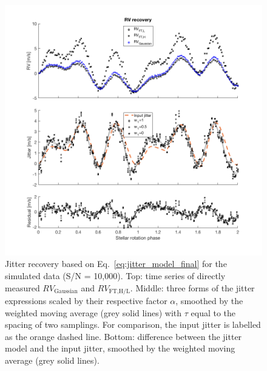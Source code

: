 \begin{figure}[tbp]
\centering
\includegraphics[width = 0.99 \linewidth]
{./Figures/Methods/5-PLANET_AND_JITTER2.png}
\caption[Jitter model]
{Jitter recovery based on Eq.~\ref{eq:jitter_model_final} for the simulated data (S/N = 10,000). Top: time series of directly measured $RV_\text{Gaussian}$ and $RV_\text{FT,H/L}$. Middle: three forms of the jitter expressions scaled by their respective factor $\alpha$, smoothed by the weighted moving average (grey solid lines) with $\tau$ equal to the spacing of two samplings. For comparison, the input jitter is labelled as the orange dashed line. Bottom: difference between the jitter model and the input jitter, smoothed by the weighted moving average (grey solid lines).}
\label{fig:PLANET_AND_JITTER}
\end{figure} 

